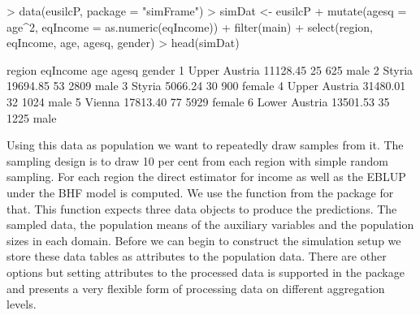 \documentclass[article]{ajs}
\begin{document}
\begin{Schunk}
\begin{Sinput}
> data(eusilcP, package = "simFrame")
> simDat <- eusilcP %
+   mutate(agesq = age^2, eqIncome = as.numeric(eqIncome)) %
+   filter(main) %
+   select(region, eqIncome, age, agesq, gender)
> head(simDat)
\end{Sinput}
\begin{Soutput}
         region eqIncome age agesq gender
1 Upper Austria 11128.45  25   625   male
2        Styria 19694.85  53  2809   male
3        Styria  5066.24  30   900 female
4 Upper Austria 31480.01  32  1024   male
5        Vienna 17813.40  77  5929 female
6 Lower Austria 13501.53  35  1225   male
\end{Soutput}
\end{Schunk}

Using this data as population we want to repeatedly draw samples from it. The sampling design is to draw 10 per cent from each region with simple random sampling. For each region the direct estimator for income as well as the EBLUP under the BHF model is computed. We use the function  from the package  for that. This function expects three data objects to produce the predictions. The sampled data, the population means of the auxiliary variables and the population sizes in each domain. Before we can begin to construct the simulation setup we store these data tables as attributes to the population data. There are other options but setting attributes to the processed data is supported in the package and presents a very flexible form of processing data on different aggregation levels.
\end{document}
